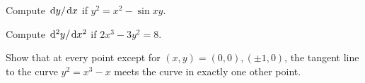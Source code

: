 \newpage

\begin{example}
Compute $\mkern 2mu \mathrm{d} y/\mkern 2mu \mathrm{d} x$ if $y^2=x^2-\sin xy$.
\end{example}

\newpage

\begin{example}
Compute $\mkern 2mu \mathrm{d}^2y/\mkern 2mu \mathrm{d} x^2$ if  $2x^3-3y^2=8$.
\end{example}

\newpage


\begin{example}
Show that at every point except for $(x,y)=(0,0), (\pm 1, 0)$, the tangent line to the curve $y^2=x^3-x$ meets the curve in exactly one other point.
\end{example}
